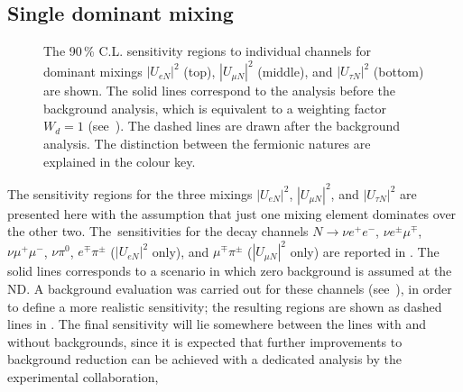 \subsection{Single dominant mixing}
\label{sec:dominant}

\begin{figure}
	\centering
	{\resizebox{\linewidth}{!}{}}
	\vspace{0.05em}

	{\resizebox{\linewidth}{!}{}}
	\vspace{0.05em}

	{\resizebox{\linewidth}{!}{}}

	\caption[Sensitivity regions to individual channels for dominant mixings with background analysis]%
		{The 90\,\% C.L. sensitivity regions to individual channels for dominant mixings %
		$|U_{e N}|^2$ (top), $|U_{\mu N}|^2$ (middle), and $|U_{\tau N}|^2$ (bottom) are shown.
		The solid lines correspond to the analysis before the background analysis, which is equivalent %
		to a weighting factor $W_d = 1$ (see~).
		The dashed lines are drawn after the background analysis.
		The distinction between the fermionic natures are explained in the colour key.}
	\label{fig:senseW}
\end{figure}

The sensitivity regions for the three mixings $|U_{e N}|^2$, $|U_{\mu N}|^2$, and %
$|U_{\tau N}|^2$ are presented here with the assumption that just one mixing element dominates over the other two.
The~sensitivities for the decay channels $N\to\nu e^+ e^-$, $\nu e^\pm \mu^\mp$, $\nu \mu^+ \mu^-$, $\nu \pi^0$, %
$e^\mp \pi^\pm$ ($|U_{e N}|^2$ only), and $\mu^\mp \pi^\pm$ ($|U_{\mu N}|^2$ only) are reported in .
The solid lines corresponds to a scenario in which zero background is assumed at the ND.
A background evaluation was carried out for these channels (see~), %
in order to define a more realistic sensitivity; %
the resulting regions are shown as dashed lines in .
The final sensitivity will lie somewhere between the lines with and without backgrounds,
since it is expected that further improvements to background reduction can be achieved %
with a dedicated analysis by the experimental collaboration, %

